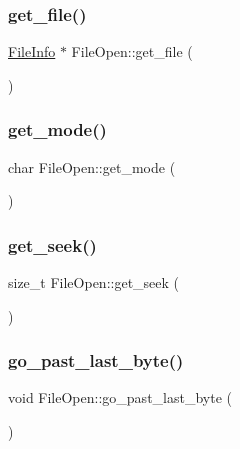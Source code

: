 \subsubsection{\texorpdfstring{get\+\_\+file()}{get\_file()}}
{\footnotesize\ttfamily \mbox{\hyperlink{class_file_info}{File\+Info}} $\ast$ File\+Open\+::get\+\_\+file (\begin{DoxyParamCaption}{ }\end{DoxyParamCaption})}

\mbox{\label{class_file_open_a716c5d9b534be9cac550f3e64620514a}} 
\subsubsection{\texorpdfstring{get\+\_\+mode()}{get\_mode()}}
{\footnotesize\ttfamily char File\+Open\+::get\+\_\+mode (\begin{DoxyParamCaption}{ }\end{DoxyParamCaption})}

\mbox{\label{class_file_open_a8acd2b1d7f9cb2fe6030a75538ce62bb}} 
\subsubsection{\texorpdfstring{get\+\_\+seek()}{get\_seek()}}
{\footnotesize\ttfamily size\+\_\+t File\+Open\+::get\+\_\+seek (\begin{DoxyParamCaption}{ }\end{DoxyParamCaption})}

\mbox{\label{class_file_open_a966a424badc21c4cfc9b80854a052acb}} 
\subsubsection{\texorpdfstring{go\+\_\+past\+\_\+last\+\_\+byte()}{go\_past\_last\_byte()}}
{\footnotesize\ttfamily void File\+Open\+::go\+\_\+past\+\_\+last\+\_\+byte (\begin{DoxyParamCaption}{ }\end{DoxyParamCaption})}

